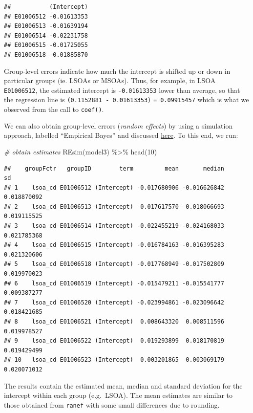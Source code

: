 \documentclass[
]{book}
\newenvironment{Shaded}{\begin{snugshade}}{\end{snugshade}}
\newcommand{\CommentTok}[1]{\textcolor[rgb]{0.56,0.35,0.01}{\textit{#1}}}
\newcommand{\DecValTok}[1]{\textcolor[rgb]{0.00,0.00,0.81}{#1}}
\newcommand{\FunctionTok}[1]{\textcolor[rgb]{0.00,0.00,0.00}{#1}}
\newcommand{\NormalTok}[1]{#1}
\newcommand{\SpecialCharTok}[1]{\textcolor[rgb]{0.00,0.00,0.00}{#1}}
\begin{document}
\begin{verbatim}
##           (Intercept)
## E01006512 -0.01613353
## E01006513 -0.01639194
## E01006514 -0.02231758
## E01006515 -0.01725055
## E01006518 -0.01885870
\end{verbatim}

Group-level errors indicate how much the intercept is shifted up or down in particular groups (ie. LSOAs or MSOAs). Thus, for example, in LSOA \texttt{E01006512}, the estimated intercept is \texttt{-0.01613353} lower than average, so that the regression line is \texttt{(0.1152881\ -\ 0.01613353)} \texttt{=\ 0.09915457} which is what we observed from the call to \texttt{coef()}.

We can also obtain group-level errors (\emph{random effects}) by using a simulation approach, labelled ``Empirical Bayes'' and discussed \href{https://stat.ethz.ch/pipermail/r-sig-mixed-models/2009q4/002984.html}{here}. To this end, we run:

\begin{Shaded}
\begin{Highlighting}[]
\CommentTok{\# obtain estimates}
\FunctionTok{REsim}\NormalTok{(model3) }\SpecialCharTok{\%\textgreater{}\%} \FunctionTok{head}\NormalTok{(}\DecValTok{10}\NormalTok{)}
\end{Highlighting}
\end{Shaded}

\begin{verbatim}
##    groupFctr   groupID        term         mean       median          sd
## 1    lsoa_cd E01006512 (Intercept) -0.017680906 -0.016626842 0.018870092
## 2    lsoa_cd E01006513 (Intercept) -0.017617570 -0.018066693 0.019115525
## 3    lsoa_cd E01006514 (Intercept) -0.022455219 -0.024168033 0.021785368
## 4    lsoa_cd E01006515 (Intercept) -0.016784163 -0.016395283 0.021320606
## 5    lsoa_cd E01006518 (Intercept) -0.017768949 -0.017502809 0.019970023
## 6    lsoa_cd E01006519 (Intercept) -0.015479211 -0.015541777 0.009387277
## 7    lsoa_cd E01006520 (Intercept) -0.023994861 -0.023096642 0.018421685
## 8    lsoa_cd E01006521 (Intercept)  0.008643320  0.008511596 0.019978527
## 9    lsoa_cd E01006522 (Intercept)  0.019293899  0.018170819 0.019429499
## 10   lsoa_cd E01006523 (Intercept)  0.003201865  0.003069179 0.020071012
\end{verbatim}

The results contain the estimated mean, median and standard deviation for the intercept within each group (e.g.~LSOA). The mean estimates are similar to those obtained from \texttt{ranef} with some small differences due to rounding.
\end{document}
